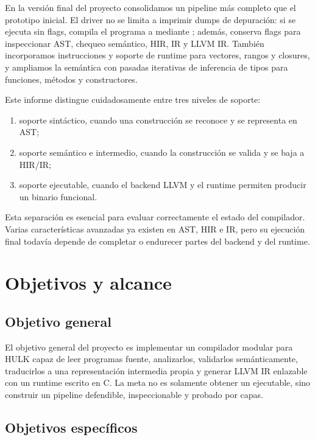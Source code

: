 \documentclass[12pt,letterpaper]{article}
\newcommand{\repo}[1]{\texttt{\detokenize{#1}}}
\newcommand{\hulk}{\textsc{HULK}}
\begin{document}
En la versión final del proyecto consolidamos un pipeline más completo que el prototipo inicial. El driver no se limita a imprimir dumps de depuración: si se ejecuta sin flags, compila el programa a \repo{output} mediante \repo{clang}; además, conserva flags para inspeccionar AST, chequeo semántico, HIR, IR y LLVM IR. También incorporamos instrucciones y soporte de runtime para vectores, rangos y closures, y ampliamos la semántica con pasadas iterativas de inferencia de tipos para funciones, métodos y constructores.

Este informe distingue cuidadosamente entre tres niveles de soporte:

\begin{enumerate}[label=\arabic*.]
    \item soporte sintáctico, cuando una construcción se reconoce y se representa en AST;
    \item soporte semántico e intermedio, cuando la construcción se valida y se baja a HIR/IR;
    \item soporte ejecutable, cuando el backend LLVM y el runtime permiten producir un binario funcional.
\end{enumerate}

Esta separación es esencial para evaluar correctamente el estado del compilador. Varias características avanzadas ya existen en AST, HIR e IR, pero su ejecución final todavía depende de completar o endurecer partes del backend y del runtime.

\section{Objetivos y alcance}

\subsection{Objetivo general}

El objetivo general del proyecto es implementar un compilador modular para \hulk{} capaz de leer programas fuente, analizarlos, validarlos semánticamente, traducirlos a una representación intermedia propia y generar LLVM IR enlazable con un runtime escrito en C. La meta no es solamente obtener un ejecutable, sino construir un pipeline defendible, inspeccionable y probado por capas.

\subsection{Objetivos específicos}
\end{document}
